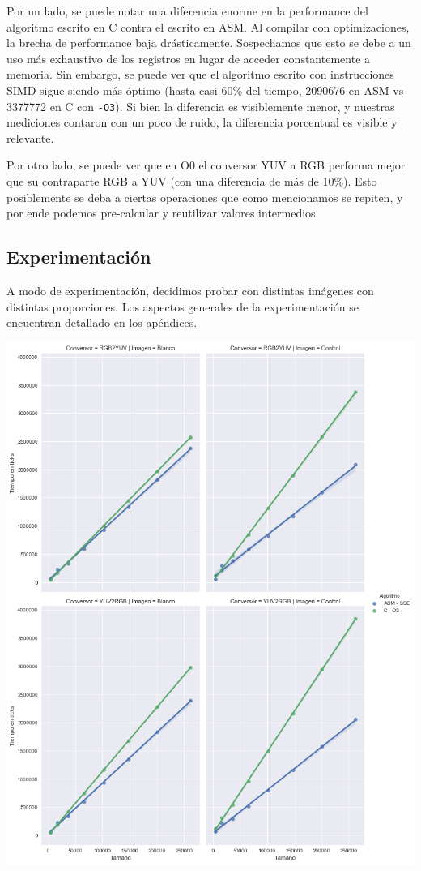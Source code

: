 Por un lado, se puede notar una diferencia enorme en la performance del algoritmo escrito en C contra el escrito en ASM. Al compilar con optimizaciones, la brecha de performance baja drásticamente. Sospechamos que esto se debe a un uso más exhaustivo de los registros en lugar de acceder constantemente a memoria. Sin embargo, se puede ver que el algoritmo escrito con instrucciones SIMD sigue siendo más óptimo (hasta casi 60\% del tiempo, 2090676 en ASM vs 3377772 en C con \texttt{-O3}). Si bien la diferencia es visiblemente menor, y nuestras mediciones contaron con un poco de ruido, la diferencia porcentual es visible y relevante.

Por otro lado, se puede ver que en O0 el conversor YUV a RGB performa mejor que su contraparte RGB a YUV (con una diferencia de más de 10\%). Esto posiblemente se deba a ciertas operaciones que como mencionamos se repiten, y por ende podemos pre-calcular y reutilizar valores intermedios.

\subsection{Experimentación}

A modo de experimentación, decidimos probar con distintas imágenes con distintas proporciones. Los aspectos generales de la experimentación se encuentran detallado en los apéndices.

\begin{center}
	\includegraphics[scale=0.5]{img/conversores_blanco.png}
\end{center}


